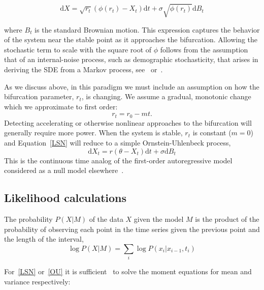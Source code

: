\documentclass[authoryear,review,11pt]{elsarticle}
\newcommand{\ud}{\mathrm{d}}
\begin{document}
\begin{equation}
\ud X = \sqrt{ r_t } (\phi(r_t) - X_t)\ud t + \sigma\sqrt{\phi(r_t) } \ud B_t \label{LSN}
\end{equation}

where $B_t$ is the standard Brownian motion. 
This expression captures the behavior of the system near the stable point as it approaches the bifurcation.
Allowing the stochastic term to scale with the square root of $\phi$ follows from the assumption that
of an internal-noise process, such as demographic stochasticity, that arises in deriving the SDE from
a Markov process, see~\citet{Kampen2007a} or~\citet{Black2012}.  

As we discuss above, in this paradigm we must include an assumption on how the bifurcation parameter, $r_t$, is changing.
We assume a gradual, monotonic change which we approximate to first order:
\begin{equation}
r_t = r_0 - m t.
\label{R_t}
\end{equation}
Detecting accelerating or otherwise nonlinear approaches to the bifurcation will generally require more power.
When the system is stable, $r_t$ is constant ($m=0$) and Equation~\eqref{LSN} will reduce to a simple Ornstein-Uhlenbeck process,
\begin{equation}
\ud X_t = r (\theta - X_t) \ud t + \sigma \ud B_t \label{OU}
\end{equation}
This is the continuous time analog of the first-order autoregressive model considered as a null model elsewhere~\citep[\emph{e.g.}][]{Dakos2008, Guttal2008a}.




\subsection*{Likelihood calculations}
The probability \(P(X|M) \) of the data \(X\) given the model \(M\) is the product of the probability of observing each point in the time series given the previous point and the length of the interval,
\begin{equation}
\log P(X | M)=  \sum_i \log P(x_i | x_{i-1}, t_i)
\end{equation}

For~\eqref{LSN} or~\eqref{OU} it is sufficient~\citep{Gardiner2009} to solve the moment equations for mean and variance respectively:
\end{document}
